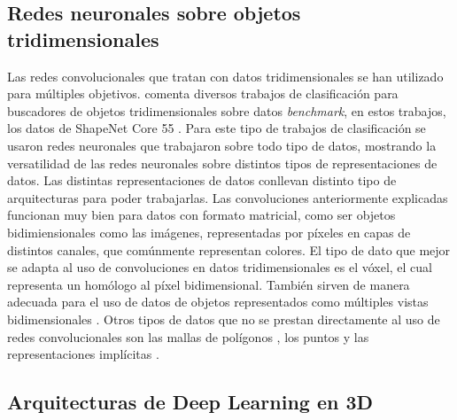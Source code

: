 \documentclass[12pt, spanish]{article}
\begin{document}
\subsection{Redes neuronales sobre objetos tridimensionales}
Las redes convolucionales que tratan con datos tridimensionales se
han utilizado para múltiples objetivos. \cite{savva2016large, savva2017large}
comenta diversos trabajos de clasificación para buscadores de objetos
tridimensionales sobre datos \textit{benchmark}, en estos trabajos,
los datos de ShapeNet Core 55 \cite{chang2015shapenet}. Para este
tipo de trabajos de clasificación se usaron redes neuronales que
trabajaron sobre todo tipo de datos, mostrando la versatilidad de
las redes neuronales sobre distintos tipos de representaciones de
datos.
Las distintas representaciones de datos conllevan distinto tipo
de arquitecturas para poder trabajarlas. Las convoluciones
anteriormente explicadas funcionan muy bien para datos con formato
matricial, como ser objetos bidimiensionales como las imágenes,
representadas por píxeles en capas de distintos canales,
que comúnmente representan colores. El tipo de dato que mejor se
adapta al uso de convoluciones en datos tridimensionales es el
vóxel, el cual representa un homólogo al píxel bidimensional.
También sirven de manera adecuada para el uso de datos de objetos
representados como múltiples vistas bidimensionales \cite{arsalan2017synthesizing}.
Otros tipos de datos que no se prestan directamente al uso de redes convolucionales
son las mallas de polígonos \cite{Gao2019}, los puntos \cite{Qi2017, qi2017pointnet}
y las representaciones implícitas \cite{Park2019}.


\subsection{Arquitecturas de Deep Learning en 3D}
\end{document}
